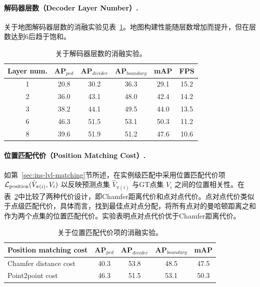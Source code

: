\documentclass{article} %
\begin{document}
\paragraph{解码器层数（Decoder Layer Number）.}
关于地图解码器层数的消融实验见表~\ref{tab:layer-number}。地图构建性能随层数增加而提升，但在层数达到6后趋于饱和。


\begin{table}[ht]
\begin{center}
\begin{tabular}{c|ccc|cc}
\hline
\rowcolor{Gray}
Layer num. & AP$_{\textit{ped}}$ & AP$_{\textit{divider}}$ & AP$_{\textit{boundary}}$ &mAP & FPS  \\
\toprule
1  &20.8 & 30.2 & 36.3& 29.1 & 15.2 \\
2  &36.0 & 43.1 & 48.0 & 42.4 & 14.2\\
3 &38.2 &44.1 & 49.5&  44.0 & 13.5\\
6 &\cellcolor{blue!10}46.3&\cellcolor{blue!10}51.5&\cellcolor{blue!10}53.1&\cellcolor{blue!10}50.3&\cellcolor{blue!10}11.2\\
8 &39.6 & 51.9 & 51.2& 47.6 & 10.6\\
\bottomrule
\end{tabular}
\end{center}
\vspace*{-0.45cm}
\caption{关于解码器层数的消融实验。}
\label{tab:layer-number}
\vspace*{-0.35cm}
\end{table}


\paragraph{位置匹配代价（Position Matching Cost）.}
如第~\ref{sec:ins-lvl-matching}节所述，在实例级匹配中采用位置匹配代价项 $\mathcal{L}_{\rm position}(\hat{V}_{\pi(i)}, V_i)$ 以反映预测点集 $\hat{V}_{\pi(i)}$ 与GT点集 $V_i$ 之间的位置相关性。在表~\ref{tab:position-matching-cost}中比较了两种代价设计，即Chamfer距离代价和点对点代价。点对点代价类似于点级匹配代价，具体而言，找到最佳点对点分配，将所有点对的曼哈顿距离之和作为两个点集的位置匹配代价。实验表明点对点代价优于Chamfer距离代价。
\begin{table}[ht!]
\begin{center}
\begin{tabular}{l|ccc|c}
\hline
\rowcolor{Gray}
Position matching cost& AP$_{\textit{ped}}$ & AP$_{\textit{divider}}$ & AP$_{\textit{boundary}}$ &mAP\\
\toprule
Chamfer distance cost & 40.3 & 53.8 & 48.5& 47.5 \\
Point2point cost  &\cellcolor{blue!10}46.3&\cellcolor{blue!10}51.5&\cellcolor{blue!10}53.1&\cellcolor{blue!10}50.3\\
\bottomrule
\end{tabular}
\end{center}
\vspace*{-0.45cm}
\caption{关于位置匹配代价项的消融实验。}
\label{tab:position-matching-cost}
\vspace*{-0.35cm}
\end{table}
\end{document}
